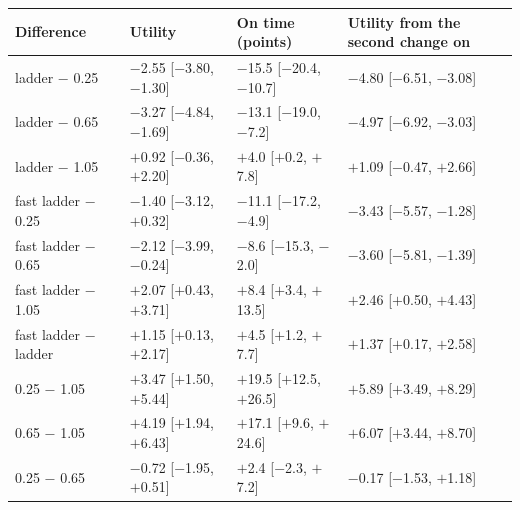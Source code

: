 \begin{tabular}{llll}
\toprule
Difference & Utility & On time (points) & Utility from the second change on \\
\midrule
ladder $-$ 0.25 & $-$2.55 [$-$3.80, $-$1.30] & $-$15.5 [$-$20.4, $-$10.7] & $-$4.80 [$-$6.51, $-$3.08] \\
ladder $-$ 0.65 & $-$3.27 [$-$4.84, $-$1.69] & $-$13.1 [$-$19.0, $-$7.2] & $-$4.97 [$-$6.92, $-$3.03] \\
ladder $-$ 1.05 & $+$0.92 [$-$0.36, $+$2.20] & $+$4.0 [$+$0.2, $+$7.8] & $+$1.09 [$-$0.47, $+$2.66] \\
\midrule
fast ladder $-$ 0.25 & $-$1.40 [$-$3.12, $+$0.32] & $-$11.1 [$-$17.2, $-$4.9] & $-$3.43 [$-$5.57, $-$1.28] \\
fast ladder $-$ 0.65 & $-$2.12 [$-$3.99, $-$0.24] & $-$8.6 [$-$15.3, $-$2.0] & $-$3.60 [$-$5.81, $-$1.39] \\
fast ladder $-$ 1.05 & $+$2.07 [$+$0.43, $+$3.71] & $+$8.4 [$+$3.4, $+$13.5] & $+$2.46 [$+$0.50, $+$4.43] \\
\midrule
fast ladder $-$ ladder & $+$1.15 [$+$0.13, $+$2.17] & $+$4.5 [$+$1.2, $+$7.7] & $+$1.37 [$+$0.17, $+$2.58] \\
\midrule
0.25 $-$ 1.05 & $+$3.47 [$+$1.50, $+$5.44] & $+$19.5 [$+$12.5, $+$26.5] & $+$5.89 [$+$3.49, $+$8.29] \\
0.65 $-$ 1.05 & $+$4.19 [$+$1.94, $+$6.43] & $+$17.1 [$+$9.6, $+$24.6] & $+$6.07 [$+$3.44, $+$8.70] \\
0.25 $-$ 0.65 & $-$0.72 [$-$1.95, $+$0.51] & $+$2.4 [$-$2.3, $+$7.2] & $-$0.17 [$-$1.53, $+$1.18] \\
\bottomrule
\end{tabular}
